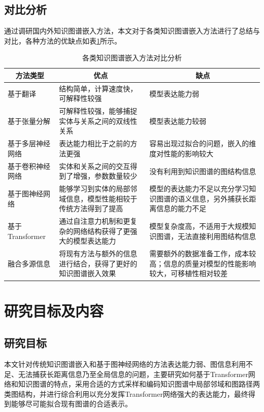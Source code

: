 \subsection{对比分析}
通过调研国内外知识图谱嵌入方法，本文对于各类知识图谱嵌入方法进行了总结与对比，各种方法的优缺点如表\ref{ComparativeAnalysis}所示。
\begin{table}[htbp]
  \renewcommand\arraystretch{1.5}
  \caption{各类知识图谱嵌入方法对比分析}
  \label{ComparativeAnalysis}
  \centering
  
  \begin{tabular}{lp{6cm}p{5cm}}
    \toprule
    \multicolumn{1}{c}{方法类型} & \multicolumn{1}{c}{优点} & \multicolumn{1}{c}{缺点}\\
    \midrule
    基于翻译 & 结构简单，计算速度快，可解释性较强& 模型表达能力弱\\
    基于张量分解 & 可解释性较强，能够捕捉实体与关系之间的双线性关系 & 模型表达能力较弱\\
    基于多层神经网络 & 表达能力相比于之前的方法更强 & 容易出现过拟合的问题，嵌入的维度对性能的影响较大\\
    基于卷积神经网络 & 实体和关系之间的交互得到了增强，参数数量较少&没有利用到知识图谱的图结构信息\\
    基于图神经网络 & 能够学习到实体的局部邻域信息，模型性能相较于传统方法得到了提高 & 模型的表达能力不足以充分学习知识图谱的语义信息，另外捕获长距离信息的能力不足\\
    基于Transformer &通过自注意力机制和更复杂的网络结构获得了更强大的模型表达能力 & 模型复杂度高，不适用于大规模知识图谱，无法直接利用图结构信息\\
    融合多源信息 & 将现有方法与额外的信息进行结合，获得了更好的知识图谱嵌入效果 & 需要额外的数据准备工作，成本较高；信息的质量对模型的性能影响较大，可移植性相对较差\\
    \bottomrule
  \end{tabular}
\end{table}

\section{研究目标及内容}
\subsection{研究目标}
本文针对传统知识图谱嵌入和基于图神经网络的方法表达能力弱、图信息利用不足、无法捕获长距离信息乃至全局信息的问题，主要研究如何基于Transformer网络和知识图谱的特点，采用合适的方式采样和编码知识图谱中局部邻域和图路径两类图结构，并进行综合利用以充分发挥Transformer网络强大的表达能力，最终得到能够尽可能拟合现有图谱的合适表示。

